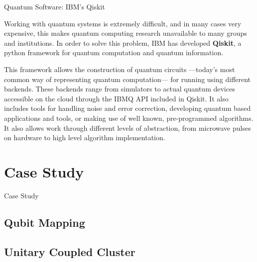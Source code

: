 \documentclass[9pt, handout, aspectratio=169]{beamer}		%
\begin{document}
	\begin{frame}{Quantum Software: IBM's Qiskit}
	
		Working with quantum systems is extremely difficult, and in many cases very expensive, this makes quantum computing research unavailable to many groups and institutions. In order to solve this problem, IBM has developed \textbf{Qiskit}, a python framework for quantum computation and quantum information.
		
		\medskip
		
		This framework allows the construction of quantum circuits ---today's most common way of representing quantum computation--- for running using different backends. These backends range from simulators to actual quantum devices accessible on the cloud through the IBMQ API included in Qiskit. It also includes tools for handling noise and error correction, developing quantum based applications and tools, or making use of well known, pre-programmed algorithms. It also allows work through different levels of abstraction, from microwave pulses on hardware to high level algorithm implementation.
		
	\end{frame}
	

\section{Case Study}
	
	\begin{frame}{Case Study}
		
				
		
	\end{frame}
	

	\subsection{Qubit Mapping}
	

	\subsection{Unitary Coupled Cluster}
	
\end{document}
